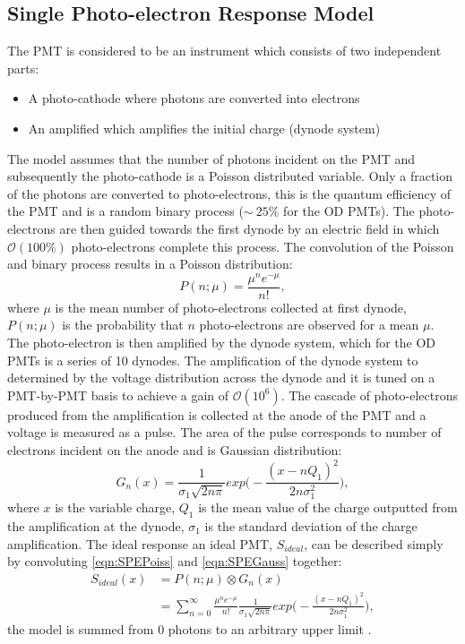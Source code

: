 \subsection{Single Photo-electron Response Model}\label{sec:SPhEResponse}
The PMT is considered to be an instrument which consists of two independent parts:
\begin{itemize}
    \item A photo-cathode where photons are converted into electrons
    \item An amplified which amplifies the initial charge (dynode system)
\end{itemize}
The model assumes that the number of photons incident on the PMT and subsequently the photo-cathode is a Poisson distributed variable. Only a fraction of the photons are converted to photo-electrons, this is the quantum efficiency of the PMT and is a random binary process ($\sim~25\%$ for the OD PMTs). The photo-electrons are then guided towards the first dynode by an electric field in which $\mathcal{O}(100\%)$ photo-electrons complete this process. The convolution of the Poisson and binary process results in a Poisson distribution:
\begin{equation}\label{eqn:SPEPoiss}
    P(n;\mu)=\frac{\mu^{n}e^{-\mu}}{n!},
\end{equation}
where $\mu$ is the mean number of photo-electrons collected at first dynode, $P(n;\mu)$ is the probability that $n$ photo-electrons are observed for a mean $\mu$.
The photo-electron is then amplified by the dynode system, which for the OD PMTs is a series of 10 dynodes. The amplification of the dynode system to determined by the voltage distribution across the dynode and it is tuned on a PMT-by-PMT basis to achieve a gain of $\mathcal{O}(10^6)$. The cascade of photo-electrons produced from the amplification is collected at the anode of the PMT and a voltage is measured as a pulse. The area of the pulse corresponds to number of electrons incident on the anode and is Gaussian distribution:
\begin{equation}\label{eqn:SPEGauss}
    G_n(x)=\frac{1}{\sigma_1\sqrt{2n\pi}}exp\biggl(-\frac{(x-nQ_1)^2}{2n\sigma_1^2}\biggl),
\end{equation}
where $x$ is the variable charge, $Q_1$ is the mean value of the charge outputted from the amplification at the dynode, $\sigma_1$ is the standard deviation of the charge amplification.
The ideal response an ideal PMT, $S_{ideal}$, can be described simply by convoluting \autoref{eqn:SPEPoiss} and \autoref{eqn:SPEGauss} together:
\begin{equation}
    \begin{split}
    S_{ideal}(x) & = P(n;\mu)\otimes G_n(x) \\
    & = \sum^\infty_{n=0}\frac{\mu^{n}e^{-\mu}}{n!}\frac{1}{\sigma_1\sqrt{2n\pi}}exp\biggl(-\frac{(x-nQ_1)^2}{2n\sigma_1^2}\biggl),
    \end{split}
    \label{eqn:PoisPlusGauss}
\end{equation}
the model is summed from 0 photons to an arbitrary upper limit \cite{BELLAMY1994468}.
